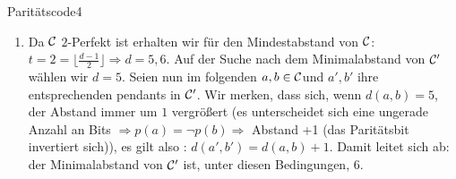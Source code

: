 \begin{aufgabe}{Paritätscode}{4}
\begin{enumerate}[label=\alph*)]
    \item Da \({\cal C}\) \(2\)-Perfekt ist erhalten wir für den Mindestabstand von \({\cal C}\):\\
    \(t = 2 = \lfloor \frac{d-1}{2} \rfloor \Rightarrow d = 5,6\). Auf der Suche nach dem Minimalabstand von \({\cal C}'\) wählen wir \(d = 5\). Seien nun im folgenden \(a,b \in {\cal C}\)und \(a',b'\) ihre entsprechenden pendants in \({\cal C}'\). Wir merken, dass sich, wenn \(d(a,b) = 5\), der Abstand immer um \(1\) vergrößert (es unterscheidet sich eine ungerade Anzahl an Bits \(\Rightarrow p(a) = \neg p(b) \Rightarrow\) Abstand +1 (das Paritätsbit invertiert sich)), es gilt also : \(d(a',b')=d(a,b)+1\). Damit leitet sich ab: der Minimalabstand von \({\cal C}'\) ist, unter diesen Bedingungen, \(6\).
\end{enumerate}
\end{aufgabe}